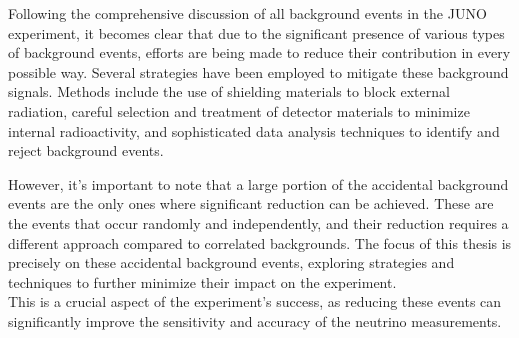 Following the comprehensive discussion of all background events in the JUNO experiment, it becomes clear that due to the significant presence of various types of background events, efforts are being made to reduce their contribution in every possible way. Several strategies have been employed to mitigate these background signals. Methods include the use of shielding materials to block external radiation, careful selection and treatment of detector materials to minimize internal radioactivity, and sophisticated data analysis techniques to identify and reject background events.

However, it's important to note that a large portion of the accidental background events are the only ones where significant reduction can be achieved. These are the events that occur randomly and independently, and their reduction requires a different approach compared to correlated backgrounds. The focus of this thesis is precisely on these accidental background events, exploring strategies and techniques to further minimize their impact on the experiment.\\
This is a crucial aspect of the experiment's success, as reducing these events can significantly improve the sensitivity and accuracy of the neutrino measurements.	 
